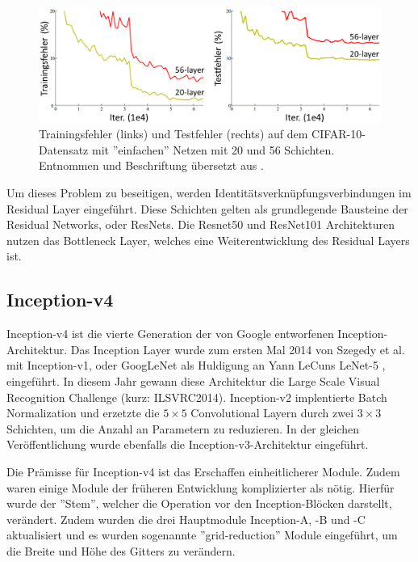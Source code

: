 \begin{figure}[h!]
\centering
\includegraphics[width=12cm]{98_images/deeper_networks_example.png}
\caption{Trainingsfehler (links) und Testfehler (rechts) auf dem CIFAR-10-Datensatz mit ''einfachen'' Netzen mit 20 und 56 Schichten. Entnommen und Beschriftung übersetzt aus \cite{deep-residual-learning}.}
\label{fig:error_deeper_networks}
\end{figure}

\mypar Um dieses Problem zu beseitigen, werden Identitätsverknüpfungsverbindungen im Residual Layer eingeführt. Diese Schichten gelten als grundlegende Bausteine der Residual Networks, oder ResNets. Die Resnet50 und ResNet101 Architekturen nutzen das Bottleneck Layer, welches eine Weiterentwicklung des Residual Layers ist. \cite{deep-residual-learning}


\subsection{Inception-v4}
Inception-v4 \cite{inception-inceptionresnet-and-the-impact-of-residual-connections-on-learning} ist die vierte Generation der von Google entworfenen Inception-Architektur. Das Inception Layer wurde zum ersten Mal 2014 von Szegedy et al. \cite{going-deeper-with-convolutions} mit Inception-v1, oder GoogLeNet als Huldigung an Yann LeCuns LeNet-5 \cite{lenet-2}, eingeführt. In diesem Jahr gewann diese Architektur die Large Scale Visual Recognition Challenge (kurz: ILSVRC2014). Inception-v2 \cite{rethinking-inception-for-computer-vision} implentierte Batch Normalization und erzetzte die $5\times5$ Convolutional Layern durch zwei $3\times3$ Schichten, um die Anzahl an Parametern zu reduzieren. In der gleichen Veröffentlichung wurde ebenfalls die Inception-v3-Architektur \cite{rethinking-inception-for-computer-vision} eingeführt.

\mypar Die Prämisse für Inception-v4 ist das Erschaffen einheitlicherer Module. Zudem waren einige Module der früheren Entwicklung komplizierter als nötig. Hierfür wurde der ''Stem'', welcher die Operation vor den Inception-Blöcken darstellt, verändert. Zudem wurden die drei Hauptmodule Inception-A, -B und -C aktualisiert und es wurden sogenannte ''grid-reduction'' Module eingeführt, um die Breite und Höhe des Gitters zu verändern. \cite{inception-inceptionresnet-and-the-impact-of-residual-connections-on-learning}


